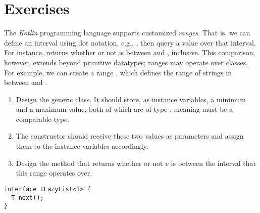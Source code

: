 \section{Exercises}


The \emph{Kotlin} programming language supports customized \emph{ranges}. That is, we can define an interval using dot notation, e.g., , then query a value over that interval. For instance,  returns whether or not  is between  and , inclusive. This comparison, however, extends beyond primitive datatypes; ranges may operate over classes. For example, we can create a range , which defines the range of strings in between  and .

\begin{enumerate}[label=(\alph*)]
    \item Design the generic  class. It should store, as instance variables, a minimum and a maximum value, both of which are of type , meaning  must be a comparable type.
    \item The  constructor should receive these two values as parameters and assign them to the instance variables accordingly. 
    \item Design the  method that returns whether or not $v$ is between the interval that this range operates over. 
\end{enumerate}


\begin{cl}{}
\begin{lstlisting}[language=MyJava]
interface ILazyList<T> {
  T next();
}
\end{lstlisting}
\end{cl}

